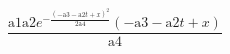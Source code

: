 \documentclass{article}
\begin{document}
\[\frac{\text{a1} \text{a2} e^{-\frac{(-\text{a3}-\text{a2} t+x)^2}{2 \text{a4}}} (-\text{a3}-\text{a2} t+x)}{\text{a4}}\]
\end{document}
